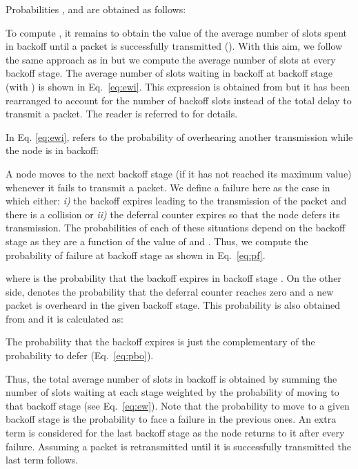 \documentclass[preprint,12pt]{elsarticle}
\begin{document}
Probabilities ,  and  are obtained as follows:



To compute , it remains to obtain the value of the average number of slots spent in backoff until a packet is successfully transmitted (). With this aim, we follow the same approach as in \cite{chung2006performance} but we compute the average number of slots at every backoff stage. The average number of slots waiting in backoff at backoff stage  (with ) is shown in Eq.~\ref{eq:ewi}. This expression is obtained from \cite{chung2006performance} but it has been rearranged to account for the number of backoff slots instead of the total delay to transmit a packet. The reader is referred to \cite{chung2006performance} for details. 


\begin{figure*}[!t]

\end{figure*}

In Eq. \ref{eq:ewi},  refers to the probability of overhearing another transmission while the node is in backoff:



A node moves to the next backoff stage (if it has not reached its maximum value) whenever it fails to transmit a packet. We define a failure here as the case in which either: \emph{i)} the backoff expires leading to the transmission of the packet and there is a collision or \emph{ii)} the deferral counter expires so that the node defers its transmission. The probabilities of each of these situations depend on the backoff stage as they are a function of the value of  and . Thus, we compute the probability of failure at backoff stage  as shown in Eq.~\ref{eq:pf}. 



where  is the probability that the backoff expires in backoff stage . On the other side,  denotes the probability that the deferral counter reaches zero and a new packet is overheard in the given backoff stage. This probability is also obtained from \cite{chung2006performance} and it is calculated as:



The probability that the backoff expires is just the complementary of the probability to defer (Eq.~\ref{eq:pbo}).



Thus, the total average number of slots in backoff is obtained by summing the number of slots waiting at each stage weighted by the probability of moving to that backoff stage (see Eq.~\ref{eq:ew}). Note that the probability to move to a given backoff stage is the probability to face a failure in the previous ones. An extra term is considered for the last backoff stage as the node returns to it after every failure. Assuming a packet is retransmitted until it is successfully transmitted the last term follows.
\end{document}
